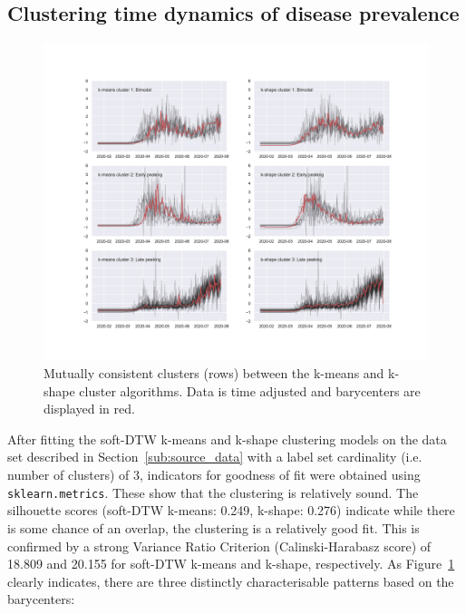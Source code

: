 \documentclass{article}
\begin{document}
\subsection{Clustering time dynamics of disease prevalence} %
\label{sub:clustering_time_dynamics_of_disease_prevalence}

\begin{figure}
	\includegraphics[width=\linewidth]{figures/side-by-side}
	\centering
	\caption{Mutually consistent clusters (rows) between the k-means and k-shape cluster algorithms. Data is time adjusted and barycenters are displayed in red.}
	\label{fig:side-by-side}
\end{figure}

After fitting the soft-DTW k-means and k-shape clustering models on the data set described in Section~\ref{sub:source_data} with a label set cardinality (i.e. number of clusters) of 3, indicators for goodness of fit were obtained using \texttt{sklearn.metrics}. These show that the clustering is relatively sound. The silhouette scores (soft-DTW k-means: 0.249, k-shape: 0.276) indicate while there is some chance of an overlap, the clustering is a relatively good fit.\cite{rousseeuw1987silhouettes} This is confirmed by a strong Variance Ratio Criterion (Calinski-Harabasz score) of 18.809 and 20.155 for soft-DTW k-means and k-shape, respectively.\cite{calinski1974dendrite} As Figure~\ref{fig:side-by-side} clearly indicates, there are three distinctly characterisable patterns based on the barycenters:
\end{document}
